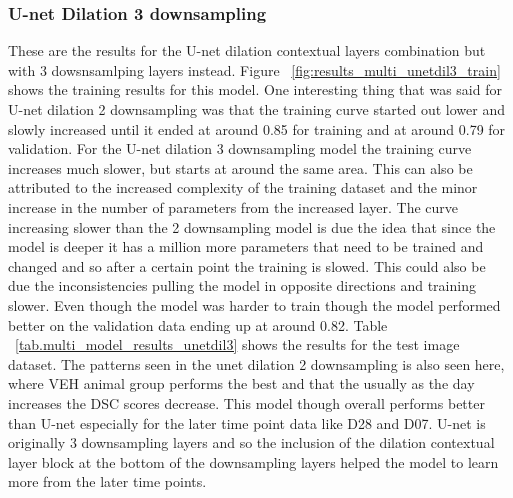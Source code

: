 \subsubsection{U-net Dilation 3 downsampling}
These are the results for the U-net dilation contextual layers combination but with 3 dowsnsamlping layers instead. 
Figure ~\ref{fig:results_multi_unetdil3_train} shows the training results for this model.
One interesting thing that was said for U-net dilation 2 downsampling was that the training curve started out lower and slowly increased until it ended at around 0.85 for training and at around 0.79 for validation. 
For the U-net dilation 3 downsampling model the training curve increases much slower, but starts at around the same area.
This can also be attributed to the increased complexity of the training dataset and the minor increase in the number of parameters from the increased layer. 
The curve increasing slower than the 2 downsampling model is due the idea that since the model is deeper it has a million more parameters that need to be trained and changed and so after a certain point the training is slowed.
This could also be due the inconsistencies pulling the model in opposite directions and training slower. 
Even though the model was harder to train though the model performed better on the validation data ending up at around 0.82. 
Table ~\ref{tab.multi_model_results_unetdil3} shows the results for the test image dataset. 
The patterns seen in the unet dilation 2 downsampling is also seen here, where VEH animal group performs the best and that the usually as the day increases the DSC scores decrease. 
This model though overall performs better than U-net especially for the later time point data like D28 and D07.
U-net is originally 3 downsampling layers and so the inclusion of the dilation contextual layer block at the bottom of the downsampling layers helped the model to learn more from the later time points. 


